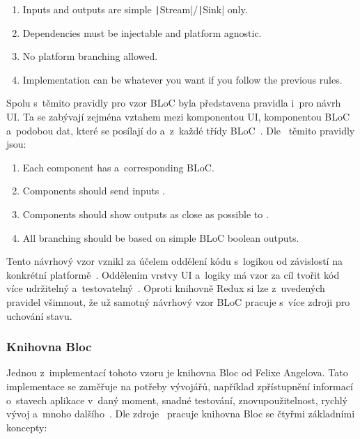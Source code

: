 \begin{enumerate}
    \item Inputs and outputs are simple
    \texttt|Stream|/\texttt|Sink| only.
    \item Dependencies must be injectable and platform agnostic.
    \item No platform branching allowed.
    \item Implementation can be whatever you want
    if you follow the previous rules.
\end{enumerate}

Spolu s~těmito pravidly pro vzor BLoC byla představena
pravidla i~pro návrh UI.
Ta se zabývají zejména vztahem mezi komponentou UI, komponentou BLoC
a~podobou dat,
které se posílají do a~z~každé třídy BLoC~\cite{googledevelopers_bloc}.
Dle~\cite{googledevelopers_bloc} těmito pravidly jsou:

\begin{enumerate}
    \item Each  component has a~corresponding BLoC.
    \item Components should send inputs .
    \item Components should show outputs as close as possible to .
    \item All branching should be based on simple BLoC boolean outputs.
\end{enumerate}

Tento návrhový vzor vznikl za účelem oddělení kódu s~logikou
od závislostí na konkrétní platformě~\cite{googledevelopers_bloc}.
Oddělením vrstvy UI a~logiky má vzor za cíl tvořit kód více udržitelný
a~testovatelný~\cite{flutterando_analyzing_bloc_mobx}.
Oproti knihovně Redux si lze z~uvedených pravidel všimnout,
že už samotný návrhový vzor BLoC pracuje s~více zdroji pro uchování stavu.

\pagebreak
\subsubsection{Knihovna Bloc}

Jednou z~implementací tohoto vzoru je knihovna Bloc od Felixe
Angelova.
Tato implementace se zaměřuje na potřeby vývojářů,
například zpřístupnění informací o~stavech aplikace v~daný moment,
snadné testování, znovupoužitelnost, rychlý vývoj a~mnoho dalšího~\cite{bloclibrary_whybloc}. 
Dle zdroje~\cite{bloclibrary_coreconcepts} pracuje knihovna Bloc se čtyřmi
základními koncepty: 

